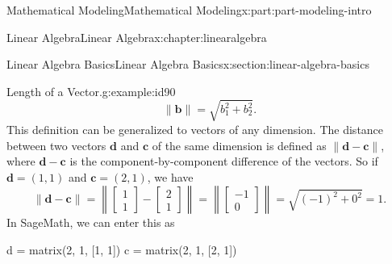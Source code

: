 \documentclass[oneside,10pt,]{book}
\numberwithin{equation}{section}
\begin{document}
\begin{partptx}{Mathematical Modeling}{}{Mathematical Modeling}{}{}{x:part:part-modeling-intro}
\begin{chapterptx}{Linear Algebra}{}{Linear Algebra}{}{}{x:chapter:linearalgebra}
\begin{sectionptx}{Linear Algebra Basics}{}{Linear Algebra Basics}{}{}{x:section:linear-algebra-basics}
\begin{example}{Length of a Vector.}{g:example:id90}
%
\begin{equation*}
\|\mathbf{b}\| = \sqrt{b_1^2 + b_2^2}.
\end{equation*}
This definition can be generalized to vectors of any dimension. The distance between two vectors \(\mathbf{d}\) and \(\mathbf{c}\) of the same dimension is defined as \(\|\mathbf{d}-\mathbf{c}\|\), where \(\mathbf{d}-\mathbf{c}\) is the component-by-component difference of the vectors. So if \(\mathbf{d} = (1,1)\) and \(\mathbf{c}= (2,1)\), we have%
%
\begin{equation*}
\|\mathbf{d} - \mathbf{c}\| = \left\|\begin{bmatrix}
1 \\
1
\end{bmatrix} - \begin{bmatrix}
2 \\
1
\end{bmatrix} \right\| = \left\| \begin{bmatrix}
-1 \\
0
\end{bmatrix} \right\| = \sqrt{(-1)^2 + 0^2} = 1.
\end{equation*}
In SageMath, we can enter this as%
\begin{sageinput}
d = matrix(2, 1, [1, 1])
c = matrix(2, 1, [2, 1])


\end{sageinput}
\end{example}
\end{sectionptx}
\end{chapterptx}
\end{partptx}
\end{document}
